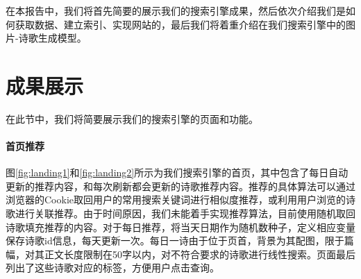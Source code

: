 \documentclass[a4paper, 10pt]{article}
\begin{document}
在本报告中，我们将首先简要的展示我们的搜索引擎成果，然后依次介绍我们是如何获取数据、建立索引、实现网站的，最后我们将着重介绍在我们搜索引擎中的图片-诗歌生成模型。


\section{成果展示}
在此节中，我们将简要展示我们的搜索引擎的页面和功能。

\paragraph*{首页推荐} 图\ref{fig:landing1}和\ref{fig:landing2}所示为我们搜索引擎的首页，其中包含了每日自动更新的推荐内容，和每次刷新都会更新的诗歌推荐内容。推荐的具体算法可以通过浏览器的Cookie取回用户的常用搜索关键词进行相似度推荐，或利用用户浏览的诗歌进行关联推荐。由于时间原因，我们未能着手实现推荐算法，目前使用随机取回诗歌填充推荐的内容。对于每日推荐，将当天日期作为随机数种子，定义相应变量保存诗歌id信息，每天更新一次。每日一诗由于位于页首，背景为其配图，限于篇幅，对其正文长度限制在50字以内，对不符合要求的诗歌进行线性搜索。页面最后列出了这些诗歌对应的标签，方便用户点击查询。
\end{document}
